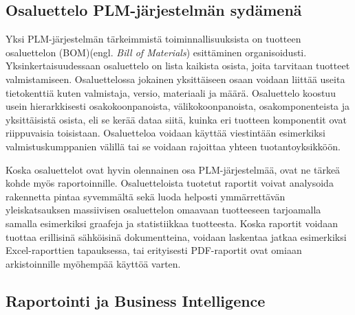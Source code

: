 \subsection{Osaluettelo PLM-järjestelmän sydämenä} \label{Osaluettelo PLM-järjestelmän sydämenä}

Yksi PLM-järjestelmän tärkeimmistä toiminnallisuuksista on tuotteen osaluettelon (BOM)(engl. \textit{Bill of Materials}) esittäminen organisoidusti. \cite{david_what_2016} Yksinkertaisuudessaan osaluettelo on lista kaikista osista, joita tarvitaan tuotteet valmistamiseen. Osaluettelossa jokainen yksittäiseen osaan voidaan liittää useita tietokenttiä kuten valmistaja, versio, materiaali ja määrä. Osaluettelo koostuu usein hierarkkisesti osakokoonpanoista, välikokoonpanoista, osakomponenteista ja yksittäisistä osista, eli se kerää dataa siitä, kuinka eri tuotteen komponentit ovat riippuvaisia toisistaan. Osaluetteloa voidaan käyttää viestintään esimerkiksi valmistuskumppanien välillä tai se voidaan rajoittaa yhteen tuotantoyksikköön. \cite{jones_visualizing_2023}

Koska osaluettelot ovat hyvin olennainen osa PLM-järjestelmää, ovat ne tärkeä kohde myös raportoinnille. Osaluetteloista tuotetut raportit voivat analysoida rakennetta pintaa syvemmältä sekä luoda helposti ymmärrettävän yleiskatsauksen massiivisen osaluettelon omaavaan tuotteeseen tarjoamalla samalla esimerkiksi graafeja ja statistiikkaa tuotteesta. Koska raportit voidaan tuottaa erillisinä sähköisinä dokumentteina, voidaan laskentaa jatkaa esimerkiksi Excel-raporttien tapauksessa, tai erityisesti PDF-raportit ovat omiaan arkistoinnille myöhempää käyttöä varten.

\subsection{Raportointi ja Business Intelligence} \label{Raportointi ja Business Intelligence}

